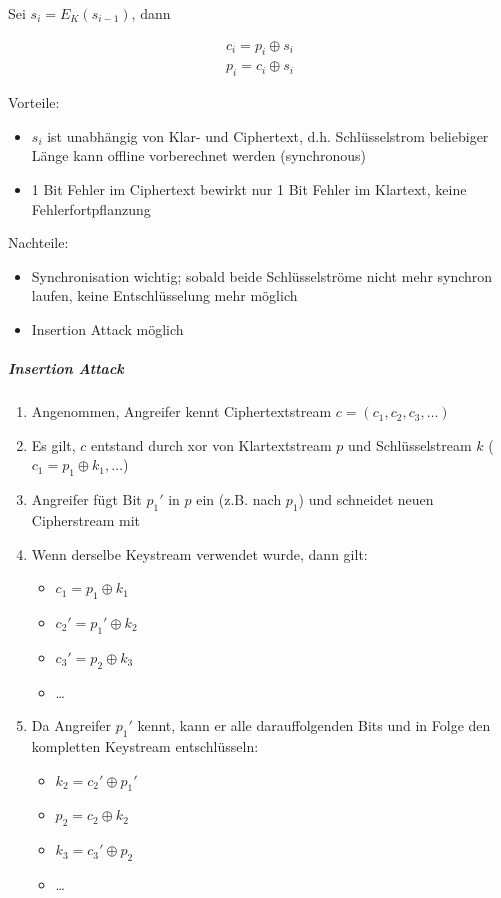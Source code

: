 Sei $s_i = E_K(s_{i-1})$, dann

\begin{align*}
    c_i = p_i \oplus s_i  \\
    p_i = c_i \oplus s_i
\end{align*}

Vorteile: 
\begin{itemize}
    \item $s_i$ ist unabhängig von Klar- und Ciphertext, d.h. Schlüsselstrom beliebiger Länge kann offline vorberechnet werden (synchronous)
    \item 1 Bit Fehler im Ciphertext bewirkt nur 1 Bit Fehler im Klartext, keine Fehlerfortpflanzung
\end{itemize}


Nachteile: 
\begin{itemize}
    \item Synchronisation wichtig; sobald beide Schlüsselströme nicht mehr synchron laufen, keine Entschlüsselung mehr möglich
    \item Insertion Attack möglich
\end{itemize}

\subparagraph{Insertion Attack}
\begin{enumerate}
    \item Angenommen, Angreifer kennt Ciphertextstream $c = (c_1, c_2, c_3, \ldots)$ 
    \item Es gilt, $c$ entstand durch xor von Klartextstream $p$ und Schlüsselstream $k$ ($c_1 = p_1 \oplus k_1, \ldots$)
    \item Angreifer fügt Bit $p_1'$ in $p$ ein (z.B. nach $p_1$) und schneidet neuen Cipherstream mit
    \item Wenn derselbe Keystream verwendet wurde, dann gilt:
    \begin{itemize}
        \item $c_1 = p_1 \oplus k_1$
        \item $c_2' = p_1' \oplus k_2$ 
        \item $c_3' = p_2 \oplus k_3$
        \item \ldots
    \end{itemize}
    \item Da Angreifer $p_1'$ kennt, kann er alle darauffolgenden Bits und in Folge den kompletten Keystream entschlüsseln:
    \begin{itemize}
        \item $k_2 = c_2' \oplus p_1'$
        \item $p_2 = c_2 \oplus k_2$
        \item $k_3 = c_3' \oplus p_2$
        \item \ldots
    \end{itemize}

\end{enumerate}


